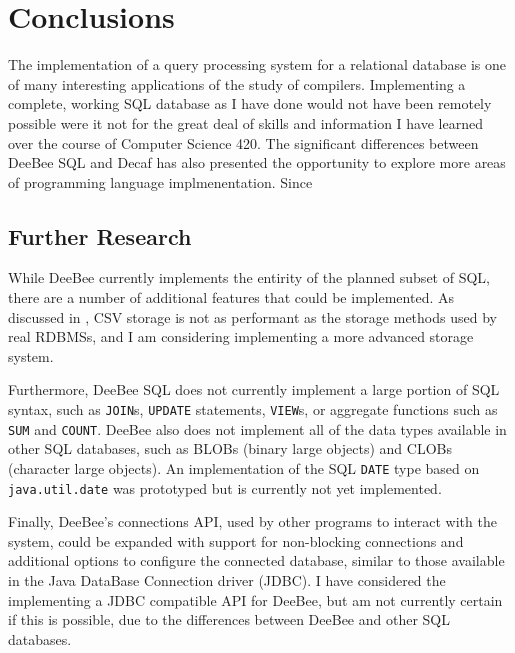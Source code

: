 \section{Conclusions}

The implementation of a query processing system for a relational database is one of many interesting applications of the study of compilers. Implementing a complete, working SQL database as I have done would not have been remotely possible were it not for the great deal of skills and information I have learned over the course of Computer Science 420. The significant differences between DeeBee SQL and Decaf has also presented the opportunity to explore more areas of programming language implmenentation. Since
\subsection{Further Research}
While DeeBee currently implements the entirity of the planned subset of SQL, there are a number of additional features that could be implemented. As discussed in , CSV storage is not as performant as the storage methods used by real RDBMSs, and I am considering implementing a more advanced storage system. 

Furthermore, DeeBee SQL does not currently implement a large portion of SQL syntax, such as \texttt{JOIN}s, \texttt{UPDATE} statements, \texttt{VIEW}s, or aggregate functions such as \texttt{SUM} and \texttt{COUNT}. DeeBee also does not implement all of the data types available in other SQL databases, such as BLOBs (binary large objects) and CLOBs (character large objects). An implementation of the SQL \texttt{DATE} type based on \texttt{java.util.date} was prototyped but is currently not yet implemented. 

Finally, DeeBee's connections API, used by other programs to interact with the system, could be expanded with support for non-blocking connections and additional options to configure the connected database, similar to those available in the Java DataBase Connection driver (JDBC). I have considered the implementing a JDBC compatible API for DeeBee, but am not currently certain if this is possible, due to the differences between DeeBee and other SQL databases.
\pagebreak
{}


